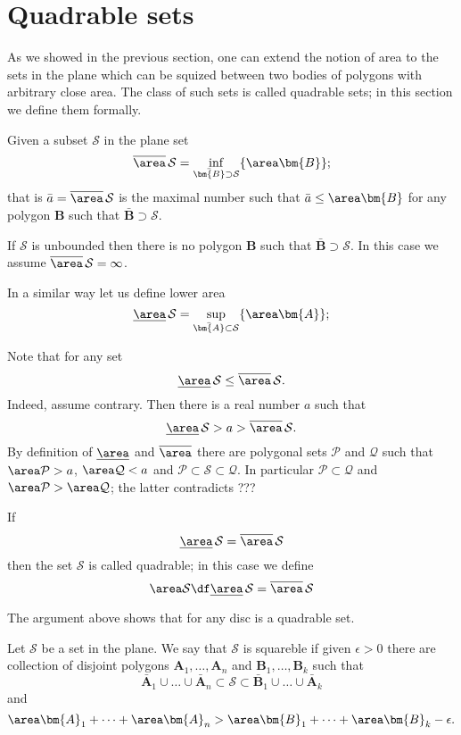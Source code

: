 \section*{Quadrable sets}

As we showed in the previous section,
one can extend the notion of area to the sets in the plane which can be squized between two bodies of polygons with arbitrary close area.
The class of such sets is called quadrable sets;
in this section we define them formally.

Given a subset  $\mathcal{S}$ in the plane
set
\[\overline\area\,\mathcal{S}=\inf_{\bar{\bm{B}}\supset \mathcal{S}}\{\area\bm{B}\};\]
that is $\bar a=\overline\area\,\mathcal{S}$ is the maximal number such that $\bar a\le \area\bm{B}$ for any polygon $\bm{B}$ such that $\bar{\bm{B}}\supset \mathcal{S}$.

If $\mathcal{S}$ is unbounded
then there is no polygon $\bm{B}$ such that $\bar{\bm{B}}\supset \mathcal{S}$.
In this case we assume $\overline\area\,\mathcal{S}=\infty$.

In a similar way let us define lower area 
\[\underline\area\,\mathcal{S}=\sup_{\bar{\bm{A}}\subset \mathcal{S}}\{\area\bm{A}\};\]

Note that for any set 
\[\underline\area\,\mathcal{S}\le\overline\area\,\mathcal{S}.\]
Indeed, assume contrary. Then there is a real number $a$ such that 
\[\underline\area\,\mathcal{S}>a>\overline\area\,\mathcal{S}.\]
By definition of $\underline\area$ and $\overline\area$ there are 
polygonal sets $\mathcal{P}$ and $\mathcal{Q}$ 
such that $\area\mathcal{P}>a$, $\area \mathcal{Q}<a$
and $\mathcal{P}\subset \mathcal{S}\subset\mathcal{Q}$.
In particular $\mathcal{P}\subset \mathcal{Q}$ 
and $\area\mathcal{P}>\area \mathcal{Q}$;
the latter contradicts ???

If
\[\underline\area\,\mathcal{S}=\overline\area\,\mathcal{S}\]
then the set $\mathcal{S}$ is called quadrable;
in this case we define 
\[\area\mathcal{S}\df\underline\area\,\mathcal{S}=\overline\area\,\mathcal{S}\]

The argument above shows that for any disc is a quadrable set.

Let $\mathcal S$ be a set in the plane.
We say that $\mathcal S$ is squareble if 
given $\epsilon>0$ there are collection of disjoint polygons $\bm{A}_1,\dots, \bm{A}_n$ and $\bm{B}_1,\dots, \bm{B}_k$
such that
\[\bar{\bm{A}}_1\cup\dots\cup\bar{\bm{A}}_n\subset\mathcal S\subset \bar{\bm{B}}_1\cup\dots\cup\bar{\bm{A}}_k\]
and 
\[\area\bm{A}_1+\dots+\area\bm{A}_n
>
\area\bm{B}_1+\dots+\area\bm{B}_k-\epsilon.\]

